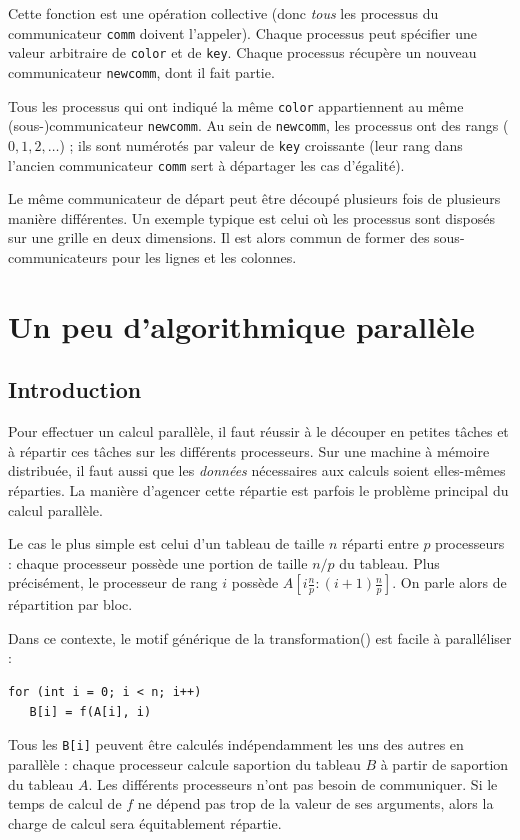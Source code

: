 Cette fonction est une opération collective (donc \emph{tous} les processus du
communicateur \verb|comm| doivent l'appeler). Chaque processus peut spécifier
une valeur arbitraire de \verb|color| et de \verb|key|. Chaque processus
récupère un nouveau communicateur \verb|newcomm|, dont il fait partie.

Tous les processus qui ont indiqué la même \verb|color| appartiennent au même
(sous-)communicateur \verb|newcomm|. Au sein de \verb|newcomm|, les processus
ont des rangs ($0, 1, 2, \dots$) ; ils sont numérotés par valeur de \verb|key|
croissante (leur rang dans l'ancien communicateur \verb|comm| sert à départager
les cas d'égalité).

Le même communicateur de départ peut être découpé plusieurs fois de plusieurs
manière différentes. Un exemple typique est celui où les processus sont disposés
sur une grille en deux dimensions. Il est alors commun de former des
sous-communicateurs pour les lignes et les colonnes.

\chapter{Un peu d'algorithmique parallèle}

\section{Introduction}

Pour effectuer un calcul parallèle, il faut réussir à le découper en petites
tâches et à répartir ces tâches sur les différents processeurs. Sur une machine
à mémoire distribuée, il faut aussi que les \emph{données} nécessaires aux
calculs soient elles-mêmes réparties. La manière d'agencer cette répartie est
parfois le problème principal du calcul parallèle.

Le cas le plus simple est celui d'un tableau de taille $n$ réparti entre $p$
processeurs : chaque processeur possède une portion de taille $n/p$ du
tableau. Plus précisément, le processeur de rang $i$ possède
$A\left[i \frac{n}{p} : (i+1) \frac{n}{p}\right]$. On parle alors de répartition
\og par bloc\fg.

Dans ce contexte, le motif générique de la \og transformation\fg ()
est facile à paralléliser :
\begin{verbatim}
for (int i = 0; i < n; i++)
   B[i] = f(A[i], i)
\end{verbatim}

Tous les \texttt{B[i]} peuvent être calculés indépendamment les uns des
autres en parallèle : chaque processeur calcule \og sa\fg portion du tableau $B$
à partir de \og sa\fg portion du tableau $A$. Les différents processeurs n'ont
pas besoin de communiquer. Si le temps de calcul de $f$ ne dépend pas trop de la
valeur de ses arguments, alors la charge de calcul sera équitablement répartie.

